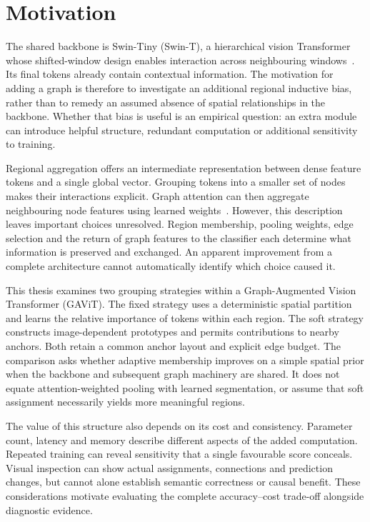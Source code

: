 \section{Motivation}

The shared backbone is Swin-Tiny (Swin-T), a hierarchical vision Transformer whose
shifted-window design enables interaction across neighbouring
windows~\cite{liu2021swin}. Its final tokens already contain contextual
information. The motivation for adding a graph is therefore to investigate
an additional regional inductive bias, rather than to remedy an assumed
absence of spatial relationships in the backbone. Whether that bias is
useful is an empirical question: an extra module can introduce helpful
structure, redundant computation or additional sensitivity to training.

Regional aggregation offers an intermediate representation between dense
feature tokens and a single global vector. Grouping tokens into a smaller
set of nodes makes their interactions explicit. Graph attention can then
aggregate neighbouring node features using learned
weights~\cite{velickovic2018gat}. However, this description leaves important
choices unresolved. Region membership, pooling weights, edge selection and
the return of graph features to the classifier each determine what
information is preserved and exchanged. An apparent improvement from a
complete architecture cannot automatically identify which choice caused it.

This thesis examines two grouping strategies within a Graph-Augmented Vision
Transformer (GAViT). The fixed strategy uses a deterministic spatial partition and
learns the relative importance of tokens within each region. The soft
strategy constructs image-dependent prototypes and permits contributions to
nearby anchors. Both retain a common anchor layout and explicit edge budget.
The comparison asks whether adaptive membership improves on a simple spatial
prior when the backbone and subsequent graph machinery are shared. It does
not equate attention-weighted pooling with learned segmentation, or assume
that soft assignment necessarily yields more meaningful regions.

The value of this structure also depends on its cost and consistency.
Parameter count, latency and memory describe different aspects of the added
computation. Repeated training can reveal sensitivity that a single favourable
score conceals. Visual inspection can show actual assignments, connections
and prediction changes, but cannot alone establish semantic correctness or
causal benefit. These considerations motivate evaluating the complete
accuracy--cost trade-off alongside diagnostic evidence.

